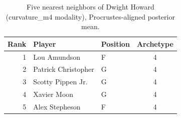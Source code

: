 \begin{table}[htbp]
  \centering\small
  \begin{tabular}{rllc}
    \toprule
    Rank & Player & Position & Archetype \\
    \midrule
    1 & Lou Amundson & F & 4 \\
    2 & Patrick Christopher & G & 4 \\
    3 & Scotty Pippen Jr. & G & 4 \\
    4 & Xavier Moon & G & 4 \\
    5 & Alex Stepheson & F & 4 \\
    \bottomrule
  \end{tabular}
  \caption{Five nearest neighbors of Dwight Howard (curvature_m4 modality), Procrustes-aligned posterior mean.}
  \label{tab:Dwight_Howard_neighbors_curvature_m4}
\end{table}

